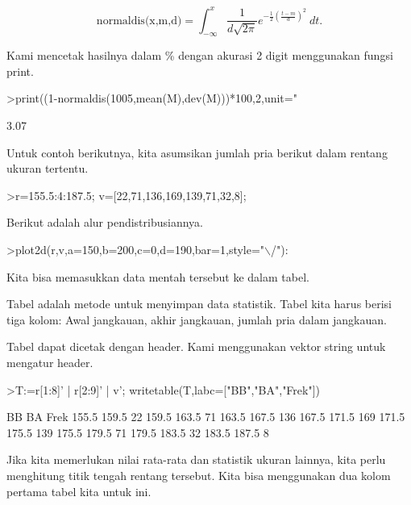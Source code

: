 \documentclass[a4paper,10pt]{article}
\begin{document}
\begin{eulernotebook}
\begin{eulercomment}
\begin{eulercomment}
\begin{eulercomment}
\end{eulercomment}
\begin{eulerformula}
\[
\text{normaldis(x,m,d)}=\int_{-\infty}^x \frac{1}{d\sqrt{2\pi}}e^{-\frac{1}{2}(\frac{t-m}{d})^2}\ dt.
\]
\end{eulerformula}
\begin{eulercomment}
Kami mencetak hasilnya dalam \% dengan akurasi 2 digit menggunakan
fungsi print.
\end{eulercomment}
\begin{eulerprompt}
>print((1-normaldis(1005,mean(M),dev(M)))*100,2,unit=" %
\end{eulerprompt}
\begin{euleroutput}
        3.07 %
\end{euleroutput}
\begin{eulercomment}
Untuk contoh berikutnya, kita asumsikan jumlah pria berikut dalam
rentang ukuran tertentu.
\end{eulercomment}
\begin{eulerprompt}
>r=155.5:4:187.5; v=[22,71,136,169,139,71,32,8];
\end{eulerprompt}
\begin{eulercomment}
Berikut adalah alur pendistribusiannya.
\end{eulercomment}
\begin{eulerprompt}
>plot2d(r,v,a=150,b=200,c=0,d=190,bar=1,style="\(\backslash\)/"):
\end{eulerprompt}
\begin{eulercomment}
Kita bisa memasukkan data mentah tersebut ke dalam tabel.

Tabel adalah metode untuk menyimpan data statistik. Tabel kita harus
berisi tiga kolom: Awal jangkauan, akhir jangkauan, jumlah pria dalam
jangkauan.

Tabel dapat dicetak dengan header. Kami menggunakan vektor string
untuk mengatur header.
\end{eulercomment}
\begin{eulerprompt}
>T:=r[1:8]' | r[2:9]' | v'; writetable(T,labc=["BB","BA","Frek"])
\end{eulerprompt}
\begin{euleroutput}
          BB        BA      Frek
       155.5     159.5        22
       159.5     163.5        71
       163.5     167.5       136
       167.5     171.5       169
       171.5     175.5       139
       175.5     179.5        71
       179.5     183.5        32
       183.5     187.5         8
\end{euleroutput}
\begin{eulercomment}
Jika kita memerlukan nilai rata-rata dan statistik ukuran lainnya,
kita perlu menghitung titik tengah rentang tersebut. Kita bisa
menggunakan dua kolom pertama tabel kita untuk ini.


\end{eulercomment}
\end{eulercomment}
\end{eulercomment}
\end{eulernotebook}
\end{document}
